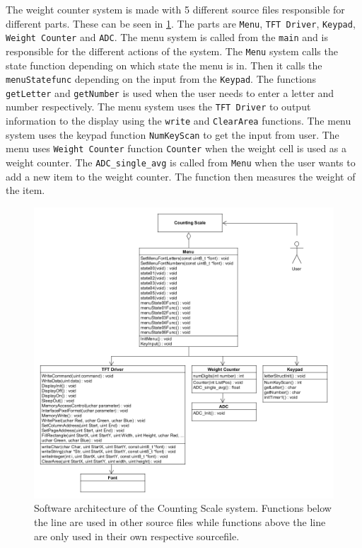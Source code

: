 The weight counter system is made with 5 different source files responsible for different parts. 
These can be seen in \cref{fig:architecture}. 
The parts are \texttt{Menu}, \texttt{TFT Driver}, \texttt{Keypad}, \texttt{Weight Counter} and \texttt{ADC}.
The menu system is called from the \texttt{main} and is responsible for the different actions of the system. 
The \texttt{Menu} system calls the state function depending on which state the menu is in. 
Then it calls the \texttt{menuStatefunc} depending on the input from the \texttt{Keypad}. The functions \texttt{getLetter} and \texttt{getNumber} is used when the user needs to enter a letter and number respectively. 
The menu system uses the \texttt{TFT Driver} to output information to the display using the \texttt{write} and \texttt{ClearArea} functions. 
The menu system uses the keypad function \texttt{NumKeyScan} to get the input from user.  
The menu uses \texttt{Weight Counter} function \texttt{Counter} when the weight cell is used as a weight counter. 
The \texttt{ADC_single_avg} is called from \texttt{Menu} when the user wants to add a new item to the weight counter. 
The function then measures the weight of the item.

\begin{figure}
\centering
\includegraphics[width=1\linewidth]{graphics/architecture}
\caption{Software architecture of the Counting Scale system. Functions below the line are used in other source files while functions above the line are only used in their own respective sourcefile.}
\label{fig:architecture}
\end{figure}
